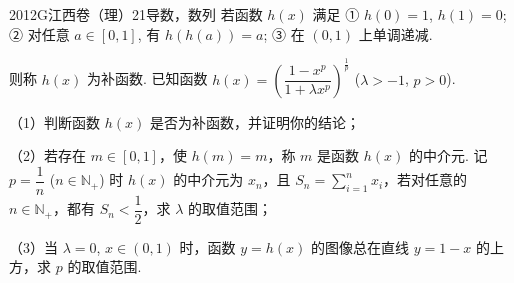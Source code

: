 
\begin{problem}{2012}{G}{江西卷（理）}{21}{导数，数列}
若函数 $h(x)$ 满足  
① $h(0)=1$, $h(1)=0$;  
② 对任意 $a\in[0,1]$, 有 $h(h(a))=a$;  
③ 在 $(0,1)$ 上单调递减.  

则称 $h(x)$ 为补函数. 已知函数 $h(x)=\left(\dfrac{1-x^p}{1+\lambda x^p}\right)^{\frac{1}{p}}$ ($\lambda>-1$, $p>0$).

（1）判断函数 $h(x)$ 是否为补函数，并证明你的结论；

（2）若存在 $m\in[0,1]$，使 $h(m)=m$，称 $m$ 是函数 $h(x)$ 的中介元. 记 $p=\dfrac{1}{n}$ ($n\in\mathbb{N}_+$) 时 $h(x)$ 的中介元为 $x_n$，且 $S_n=\sum\limits_{i=1}^{n}x_i$，若对任意的 $n\in\mathbb{N}_+$，都有 $S_n<\dfrac{1}{2}$，求 $\lambda$ 的取值范围；

（3）当 $\lambda=0$, $x\in(0,1)$ 时，函数 $y=h(x)$ 的图像总在直线 $y=1-x$ 的上方，求 $p$ 的取值范围.
\end{problem}

